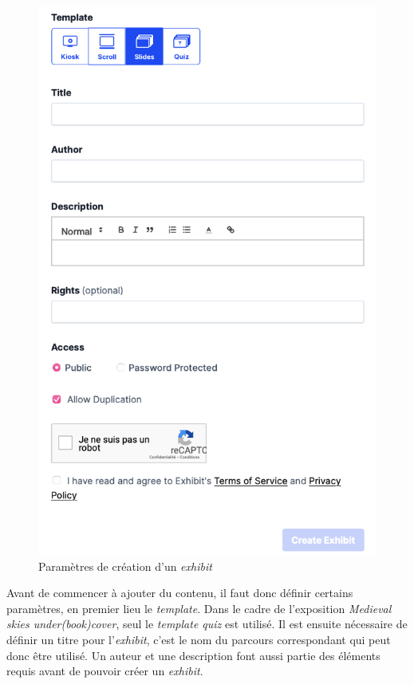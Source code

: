    \begin{figure}[h]
	\caption{Paramètres de création d'un \textit{exhibit}}
	\includegraphics[scale=0.5, angle=0]{images/partie3/exhibit/exhibit-settings.png}
    \centering
    \end{figure}
    
    Avant de commencer à ajouter du contenu, il faut donc définir certains paramètres, en premier lieu le \textit{template}. Dans le cadre de l'exposition \textit{Medieval skies under(book)cover}, seul le \textit{template quiz} est utilisé. Il est ensuite nécessaire de définir un titre pour l'\textit{exhibit}, c'est le nom du parcours correspondant qui peut donc être utilisé. Un auteur et une description font aussi partie des éléments requis avant de pouvoir créer un \textit{exhibit}. 
    
